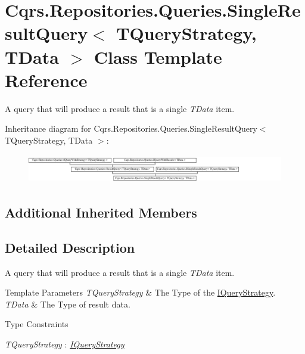 \hypertarget{classCqrs_1_1Repositories_1_1Queries_1_1SingleResultQuery}{}\section{Cqrs.\+Repositories.\+Queries.\+Single\+Result\+Query$<$ T\+Query\+Strategy, T\+Data $>$ Class Template Reference}
\label{classCqrs_1_1Repositories_1_1Queries_1_1SingleResultQuery}


A query that will produce a result that is a single {\itshape T\+Data}  item.  


Inheritance diagram for Cqrs.\+Repositories.\+Queries.\+Single\+Result\+Query$<$ T\+Query\+Strategy, T\+Data $>$\+:\begin{figure}[H]
\begin{center}
\leavevmode
\includegraphics[height=1.284404cm]{classCqrs_1_1Repositories_1_1Queries_1_1SingleResultQuery}
\end{center}
\end{figure}
\subsection*{Additional Inherited Members}


\subsection{Detailed Description}
A query that will produce a result that is a single {\itshape T\+Data}  item. 


\begin{DoxyTemplParams}{Template Parameters}
{\em T\+Query\+Strategy} & The Type of the \hyperlink{interfaceCqrs_1_1Repositories_1_1Queries_1_1IQueryStrategy}{I\+Query\+Strategy}.\\
\hline
{\em T\+Data} & The Type of result data.\\
\hline
\end{DoxyTemplParams}
\begin{Desc}
\item[Type Constraints]\begin{description}
\item[{\em T\+Query\+Strategy} : {\em \hyperlink{interfaceCqrs_1_1Repositories_1_1Queries_1_1IQueryStrategy}{I\+Query\+Strategy}}]\end{description}
\end{Desc}
